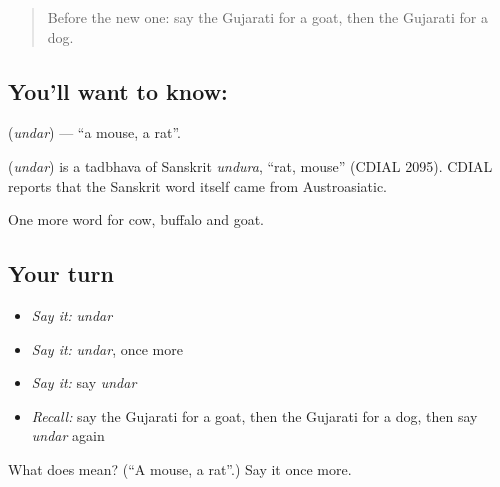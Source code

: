 \label{lesson:GU-C67-mouse}



\begin{quote}
Before the new one: say the Gujarati for a goat, then the Gujarati for a dog.
\end{quote}

\subsection*{You'll want to know: }
\textbf{} (\emph{undar}) — \textquotedblleft{}a mouse, a rat\textquotedblright{}.

\begin{cousinweb}
\textbf{} (\emph{undar}) is a tadbhava of Sanskrit \emph{undura}, \textquotedblleft{}rat, mouse\textquotedblright{} (CDIAL 2095). CDIAL reports that the Sanskrit word itself came from Austroasiatic.
\end{cousinweb}

\begin{grammarlens}[title={What you've built}]
One more word for cow, buffalo and goat.
\end{grammarlens}

\subsection*{Your turn}
\begin{itemize}
\raggedright
  \item \emph{Say it:} \emph{undar}
  \item \emph{Say it:} \emph{undar}, once more
  \item \emph{Say it:} say \emph{undar}
  \item \emph{Recall:} say the Gujarati for a goat, then the Gujarati for a dog, then say \emph{undar} again
\end{itemize}

\begin{tcolorbox}[breakable,colback=teal!4,colframe=teal!35!black,title={Before you move on}]
What does  mean? (\textquotedblleft{}A mouse, a rat\textquotedblright{}.) Say it once more.
\end{tcolorbox}
